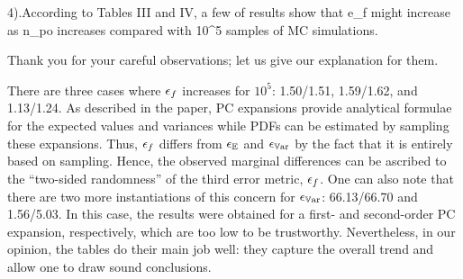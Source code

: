 \begin{reviewer}
4).According to Tables III and IV, a few of results show that e\_f might increase as n\_po increases compared with 10\^{}5 samples of MC simulations.
\end{reviewer}
\begin{authors}
Thank you for your careful observations; let us give our explanation for them.

There are three cases where $\epsilon_f$ increases for $10^5$: 1.50/1.51, 1.59/1.62, and 1.13/1.24.
As described in the paper, PC expansions provide analytical formulae for the expected values and variances while PDFs can be estimated by sampling these expansions.
Thus, $\epsilon_f$ differs from $\epsilon_\mathbb{E}$ and $\epsilon_{\mathbb{V}\text{ar}}$ by the fact that it is entirely based on sampling.
Hence, the observed marginal differences can be ascribed to the ``two-sided randomness'' of the third error metric, $\epsilon_f$.
One can also note that there are two more instantiations of this concern for $\epsilon_{\mathbb{V}\text{ar}}$: 66.13/66.70 and 1.56/5.03.
In this case, the results were obtained for a first- and second-order PC expansion, respectively, which are too low to be trustworthy.
Nevertheless, in our opinion, the tables do their main job well: they capture the overall trend and allow one to draw sound conclusions.

\begin{actions}
\end{actions}
\end{authors}

